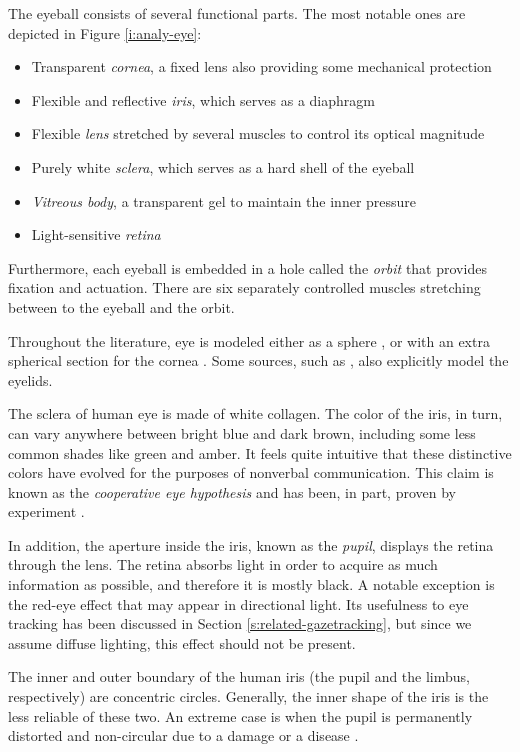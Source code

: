 The eyeball consists of several functional parts.
The most notable ones are depicted in Figure \ref{i:analy-eye}:
\begin{itemize}
\item Transparent \textit{cornea}, a fixed lens also providing some mechanical protection
\item Flexible and reflective \textit{iris}, which serves as a diaphragm
\item Flexible \textit{lens} stretched by several muscles to control its optical magnitude
\item Purely white \textit{sclera}, which serves as a hard shell of the eyeball
\item \textit{Vitreous body}, a transparent gel to maintain the inner pressure
\item Light-sensitive \textit{retina}
\end{itemize}

Furthermore, each eyeball is embedded in a hole called the \textit{orbit} that provides fixation and actuation.
There are six separately controlled muscles stretching between to the eyeball and the orbit.

Throughout the literature, eye is modeled either as a sphere \cite{zhang13}, or with an extra spherical section for the cornea \cite{villanueva08}.
Some sources, such as \cite{wang16}, also explicitly model the eyelids.

The sclera of human eye is made of white collagen.
The color of the iris, in turn, can vary anywhere between bright blue and dark brown, including some less common shades like green and amber.
It feels quite intuitive that these distinctive colors have evolved for the purposes of nonverbal communication.
This claim is known as the \textit{cooperative eye hypothesis} and has been, in part, proven by experiment \cite{tomasello07}.

In addition, the aperture inside the iris, known as the \textit{pupil}, displays the retina through the lens.
The retina absorbs light in order to acquire as much information as possible, and therefore it is mostly black.
A notable exception is the red-eye effect that may appear in directional light.
Its usefulness to eye tracking has been discussed in Section \ref{s:related-gazetracking}, but since we assume diffuse lighting, this effect should not be present.

The inner and outer boundary of the human iris (the pupil and the limbus, respectively) are concentric circles.
Generally, the inner shape of the iris is the less reliable of these two.
An extreme case is when the pupil is permanently distorted and non-circular due to a damage \cite[p.5]{bowyer16} or a disease \cite[p.146]{bowyer16}.

